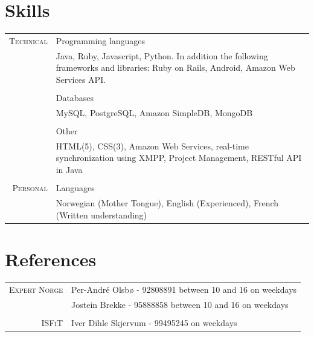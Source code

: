 \documentclass[a4paper,10pt]{article}
\begin{document}
\section{Skills}
\begin{tabular}{r|p{12cm}}
  \textsc{Technical}& Programming languages  \\&\footnotesize{Java, Ruby, Javascript, Python. In addition the following frameworks and libraries: Ruby on Rails, Android, Amazon Web Services API. }
  \\&\par \\& Databases  \\&\footnotesize{MySQL, PostgreSQL, Amazon SimpleDB, MongoDB}
  \\&\par \\& Other  \\&\footnotesize{HTML(5), CSS(3), Amazon Web Services, real-time synchronization using XMPP, Project Management, RESTful API in Java }
  \\\multicolumn{2}{c}{}\\
  \textsc{Personal}& Languages  \\&\footnotesize{Norwegian (Mother Tongue), English (Experienced), French (Written understanding)}

\end{tabular}

\section{References}
\begin{tabular}{rl}
  \textsc{Expert Norge} & Per-André Olsbø - 92808891 between 10 and 16 on weekdays
  \\& Jostein Brekke - 95888858 between 10 and 16 on weekdays
  \\\multicolumn{2}{c}{}\\
  \textsc{ISFiT}& Iver Dihle Skjervum - 99495245 on weekdays \\
\end{tabular}
\end{document}
